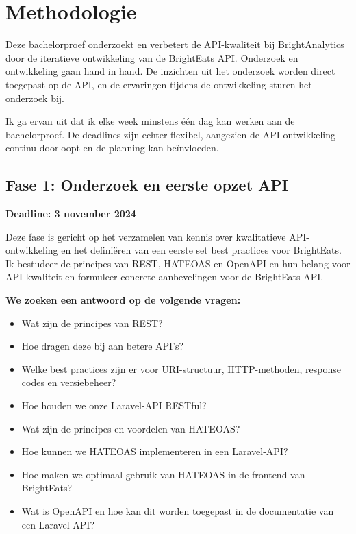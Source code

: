 \section{Methodologie}
\label{sec:methodologie}

Deze bachelorproef onderzoekt en verbetert de API-kwaliteit bij BrightAnalytics door de iteratieve ontwikkeling van de BrightEats API. Onderzoek en ontwikkeling gaan hand in hand. De inzichten uit het onderzoek worden direct toegepast op de API, en de ervaringen tijdens de ontwikkeling sturen het onderzoek bij.

\bigskip
Ik ga ervan uit dat ik elke week minstens \'e\'en dag kan werken aan de bachelorproef. De deadlines zijn echter flexibel, aangezien de API-ontwikkeling continu doorloopt en de planning kan be\"invloeden.

\subsection{Fase 1: Onderzoek en eerste opzet API}

\textbf{Deadline: 3 november 2024}

\bigskip
Deze fase is gericht op het verzamelen van kennis over kwalitatieve API-ontwikkeling en het defini\"eren van een eerste set best practices voor BrightEats. Ik bestudeer de principes van REST, HATEOAS en OpenAPI en hun belang voor API-kwaliteit en formuleer concrete aanbevelingen voor de BrightEats API.

\bigskip

\textbf{We zoeken een antwoord op de volgende vragen:}
\begin{itemize}
  \item Wat zijn de principes van REST?
  \item Hoe dragen deze bij aan betere API's?
  \item Welke best practices zijn er voor URI-structuur, HTTP-methoden, response codes en versiebeheer?
  \item Hoe houden we onze Laravel-API RESTful?
  \item Wat zijn de principes en voordelen van HATEOAS?
  \item Hoe kunnen we HATEOAS implementeren in een Laravel-API?
  \item Hoe maken we optimaal gebruik van HATEOAS in de frontend van BrightEats?
  \item Wat is OpenAPI en hoe kan dit worden toegepast in de documentatie van een Laravel-API?
\end{itemize}


